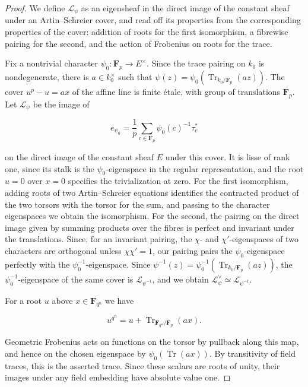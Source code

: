 \documentclass[11pt]{article}
\begin{document}
\begin{proof}[{Proof}]\label{bp172}%
We define \(\mathcal L_\psi\) as an eigensheaf in the direct image of the constant sheaf under an Artin–Schreier cover, and read off its properties from the corresponding properties of the cover: addition of roots for the first isomorphism, a fibrewise pairing for the second, and the action of Frobenius on roots for the trace.

Fix a nontrivial character \(\psi_0:\mathbf F_p\to E^\times\). Since the trace pairing on \(k_0\) is nondegenerate, there is \(a\in k_0^\times\) such that \(\psi(z)=\psi_0(\operatorname{Tr}_{k_0/\mathbf F_p}(az))\). The cover \(u^p-u=ax\) of the affine line is finite étale, with group of translations \(\mathbf F_p\). Let \(\mathcal L_\psi\) be the image of

\[
e_{\psi_0}=\frac1p\sum_{c\in\mathbf F_p}\psi_0(c)^{-1}\tau_c^*
\]

on the direct image of the constant sheaf \(E\) under this cover. It is lisse of rank one, since its stalk is the \(\psi_0\)-eigenspace in the regular representation, and the root \(u=0\) over \(x=0\) specifies the trivialization at zero. For the first isomorphism, adding roots of two Artin–Schreier equations identifies the contracted product of the two torsors with the torsor for the sum, and passing to the character eigenspaces we obtain the isomorphism. For the second, the pairing on the direct image given by summing products over the fibres is perfect and invariant under the translations. Since, for an invariant pairing, the \(\chi\)- and \(\chi'\)-eigenspaces of two characters are orthogonal unless \(\chi\chi'=1\), our pairing pairs the \(\psi_0\)-eigenspace perfectly with the \(\psi_0^{-1}\)-eigenspace. Since \(\psi^{-1}(z)=\psi_0^{-1}(\operatorname{Tr}_{k_0/\mathbf F_p}(az))\), the \(\psi_0^{-1}\)-eigenspace of the same cover is \(\mathcal L_{\psi^{-1}}\), and we obtain \(\mathcal L_\psi^\vee\simeq\mathcal L_{\psi^{-1}}\).

For a root \(u\) above \(x\in\mathbf F_{q^n}\) we have

\[
u^{q^n}=u+
\operatorname{Tr}_{\mathbf F_{q^n}/\mathbf F_p}(ax).
\]

Geometric Frobenius acts on functions on the torsor by pullback along this map, and hence on the chosen eigenspace by \(\psi_0(\operatorname{Tr}(ax))\). By transitivity of field traces, this is the asserted trace. Since these scalars are roots of unity, their images under any field embedding have absolute value one.
\end{proof}
\end{document}
